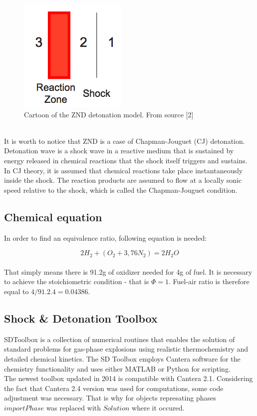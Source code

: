 \documentclass[a4paper]{article}
\newcommand{\sepspace}{\vspace*{1em}}
\begin{document}
\begin{figure}[h!]
\centering
\includegraphics[scale = 1]{01.png}
\caption{\label{fig:1}Cartoon of the ZND detonation model. From source [2]}
\end{figure}
\\

\noindent
It is worth to notice that ZND is a case of Chapman-Jouguet (CJ) detonation. Detonation wave is a shock wave in a reactive medium that is sustained by energy released in chemical reactions that the shock itself triggers and sustains. In CJ theory, it is assumed that chemical reactions take place instantaneously inside the shock. The reaction products are assumed to flow at a locally sonic speed relative to the shock, which is called the Chapman-Jouguet condition.\\

\pagebreak

\subsection{Chemical equation}


In order to find an equivalence ratio, following equation is needed:

\[{2H_2 +(O_2+3,76N_2) }
      = 2H_2O\] 
\\
That simply means there is 91.2g of oxidizer needed for 4g of fuel. It is necessary to achieve the stoichiometric condition - that is $\Phi = 1$. Fuel-air ratio is therefore equal to $4/91.2.4=0.04386$.

\sepspace
\sepspace
\subsection{Shock \& Detonation Toolbox}

SDToolbox is a collection of numerical routines that enables the solution of standard problems for gas-phase explosions using realistic thermochemistry and detailed chemical kinetics. The SD Toolbox employs Cantera software for the chemistry functionality and uses either MATLAB or Python for scripting.\\
The newest toolbox updated in 2014 is compatible with Cantera 2.1. Considering the fact that Cantera 2.4 version was used for computations, some code adjustment was necessary. That is why for objects represating phases $importPhase$ was replaced with $Solution$ where it occured.\\
\end{document}
